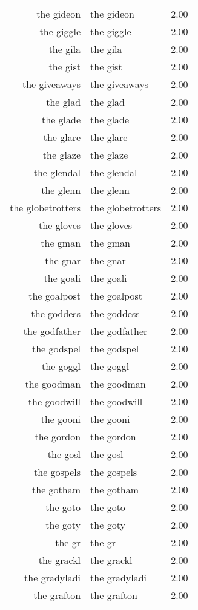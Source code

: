 \begin{table}[ht]
\begin{tabular}{rlr}
  the gideon & the gideon & 2.00 \\ 
  the giggle & the giggle & 2.00 \\ 
  the gila & the gila & 2.00 \\ 
  the gist & the gist & 2.00 \\ 
  the giveaways & the giveaways & 2.00 \\ 
  the glad & the glad & 2.00 \\ 
  the glade & the glade & 2.00 \\ 
  the glare & the glare & 2.00 \\ 
  the glaze & the glaze & 2.00 \\ 
  the glendal & the glendal & 2.00 \\ 
  the glenn & the glenn & 2.00 \\ 
  the globetrotters & the globetrotters & 2.00 \\ 
  the gloves & the gloves & 2.00 \\ 
  the gman & the gman & 2.00 \\ 
  the gnar & the gnar & 2.00 \\ 
  the goali & the goali & 2.00 \\ 
  the goalpost & the goalpost & 2.00 \\ 
  the goddess & the goddess & 2.00 \\ 
  the godfather & the godfather & 2.00 \\ 
  the godspel & the godspel & 2.00 \\ 
  the goggl & the goggl & 2.00 \\ 
  the goodman & the goodman & 2.00 \\ 
  the goodwill & the goodwill & 2.00 \\ 
  the gooni & the gooni & 2.00 \\ 
  the gordon & the gordon & 2.00 \\ 
  the gosl & the gosl & 2.00 \\ 
  the gospels & the gospels & 2.00 \\ 
  the gotham & the gotham & 2.00 \\ 
  the goto & the goto & 2.00 \\ 
  the goty & the goty & 2.00 \\ 
  the gr & the gr & 2.00 \\ 
  the grackl & the grackl & 2.00 \\ 
  the gradyladi & the gradyladi & 2.00 \\ 
  the grafton & the grafton & 2.00 \\ 

\end{tabular}
\end{table}
